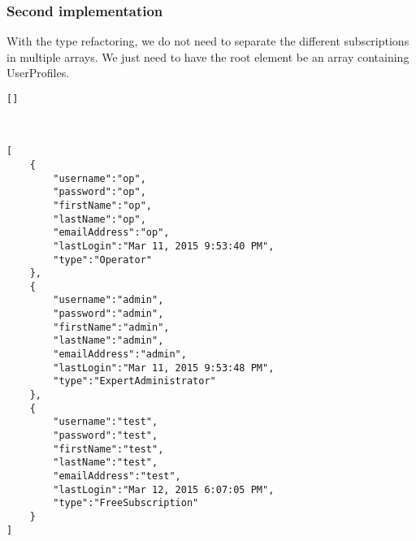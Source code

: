 \subsubsection{Second implementation}

With the type refactoring, we do not need to separate the different
subscriptions in multiple arrays. We just need to have the root element
be an array containing UserProfiles.

\begin{lstlisting}[caption={empty users.json document}]
[]
\end{lstlisting}
\

\begin{lstlisting}[caption={users.json example}]
[
    {
        "username":"op",
        "password":"op",
        "firstName":"op",
        "lastName":"op",
        "emailAddress":"op",
        "lastLogin":"Mar 11, 2015 9:53:40 PM",
        "type":"Operator"
    },
    {
        "username":"admin",
        "password":"admin",
        "firstName":"admin",
        "lastName":"admin",
        "emailAddress":"admin",
        "lastLogin":"Mar 11, 2015 9:53:48 PM",
        "type":"ExpertAdministrator"
    },
    {
        "username":"test",
        "password":"test",
        "firstName":"test",
        "lastName":"test",
        "emailAddress":"test",
        "lastLogin":"Mar 12, 2015 6:07:05 PM",
        "type":"FreeSubscription"
    }
]
\end{lstlisting}
